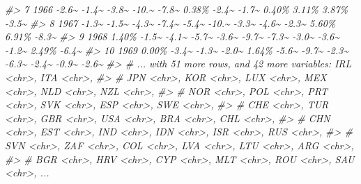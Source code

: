 \documentclass[
]{article}
\newenvironment{Shaded}{\begin{snugshade}}{\end{snugshade}}
\newcommand{\CommentTok}[1]{\textcolor[rgb]{0.56,0.35,0.01}{\textit{#1}}}
\begin{document}
\begin{Shaded}
\begin{Highlighting}[]
\CommentTok{\#\textgreater{}  7  1966 {-}2.6\textasciitilde{} {-}1.4\textasciitilde{} {-}3.8\textasciitilde{} {-}10.\textasciitilde{} {-}7.8\textasciitilde{} 0.38\% {-}2.4\textasciitilde{} {-}1.7\textasciitilde{} 0.40\% 3.11\% 3.87\% {-}3.5\textasciitilde{}}
\CommentTok{\#\textgreater{}  8  1967 {-}1.3\textasciitilde{} {-}1.5\textasciitilde{} {-}4.3\textasciitilde{} {-}7.4\textasciitilde{} {-}5.4\textasciitilde{} {-}10.\textasciitilde{} {-}3.3\textasciitilde{} {-}4.6\textasciitilde{} {-}2.3\textasciitilde{} 5.60\% 6.91\% {-}8.3\textasciitilde{}}
\CommentTok{\#\textgreater{}  9  1968 1.40\% {-}1.5\textasciitilde{} {-}4.1\textasciitilde{} {-}5.7\textasciitilde{} {-}3.6\textasciitilde{} {-}9.7\textasciitilde{} {-}7.3\textasciitilde{} {-}3.0\textasciitilde{} {-}3.6\textasciitilde{} {-}1.2\textasciitilde{} 2.49\% {-}6.4\textasciitilde{}}
\CommentTok{\#\textgreater{} 10  1969 0.00\% {-}3.4\textasciitilde{} {-}1.3\textasciitilde{} {-}2.0\textasciitilde{} 1.64\% {-}5.6\textasciitilde{} {-}9.7\textasciitilde{} {-}2.3\textasciitilde{} {-}6.3\textasciitilde{} {-}2.4\textasciitilde{} {-}0.9\textasciitilde{} {-}2.6\textasciitilde{}}
\CommentTok{\#\textgreater{} \# ... with 51 more rows, and 42 more variables: IRL \textless{}chr\textgreater{}, ITA \textless{}chr\textgreater{},}
\CommentTok{\#\textgreater{} \#   JPN \textless{}chr\textgreater{}, KOR \textless{}chr\textgreater{}, LUX \textless{}chr\textgreater{}, MEX \textless{}chr\textgreater{}, NLD \textless{}chr\textgreater{}, NZL \textless{}chr\textgreater{},}
\CommentTok{\#\textgreater{} \#   NOR \textless{}chr\textgreater{}, POL \textless{}chr\textgreater{}, PRT \textless{}chr\textgreater{}, SVK \textless{}chr\textgreater{}, ESP \textless{}chr\textgreater{}, SWE \textless{}chr\textgreater{},}
\CommentTok{\#\textgreater{} \#   CHE \textless{}chr\textgreater{}, TUR \textless{}chr\textgreater{}, GBR \textless{}chr\textgreater{}, USA \textless{}chr\textgreater{}, BRA \textless{}chr\textgreater{}, CHL \textless{}chr\textgreater{},}
\CommentTok{\#\textgreater{} \#   CHN \textless{}chr\textgreater{}, EST \textless{}chr\textgreater{}, IND \textless{}chr\textgreater{}, IDN \textless{}chr\textgreater{}, ISR \textless{}chr\textgreater{}, RUS \textless{}chr\textgreater{},}
\CommentTok{\#\textgreater{} \#   SVN \textless{}chr\textgreater{}, ZAF \textless{}chr\textgreater{}, COL \textless{}chr\textgreater{}, LVA \textless{}chr\textgreater{}, LTU \textless{}chr\textgreater{}, ARG \textless{}chr\textgreater{},}
\CommentTok{\#\textgreater{} \#   BGR \textless{}chr\textgreater{}, HRV \textless{}chr\textgreater{}, CYP \textless{}chr\textgreater{}, MLT \textless{}chr\textgreater{}, ROU \textless{}chr\textgreater{}, SAU \textless{}chr\textgreater{}, ...}
\end{Highlighting}
\end{Shaded}
\end{document}
